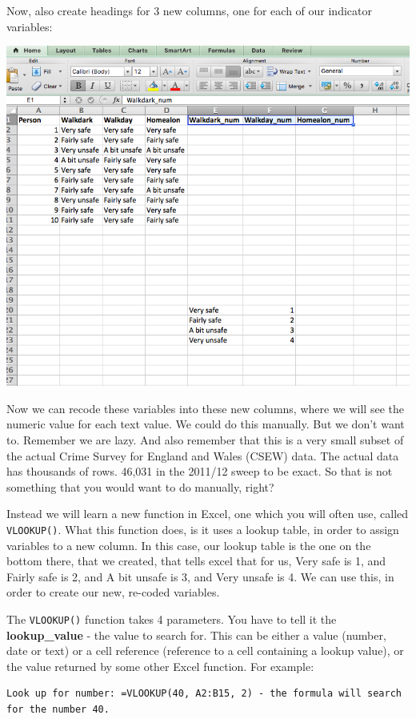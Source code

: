 \documentclass[
]{book}
\begin{document}
Now, also create headings for 3 new columns, one for each of our indicator variables:

\includegraphics{imgs/num_cols_lookup.png}

Now we can recode these variables into these new columns, where we will see the numeric value for each text value. We could do this manually. But we don't want to. Remember we are lazy. And also remember that this is a very small subset of the actual Crime Survey for England and Wales (CSEW) data. The actual data has thousands of rows. 46,031 in the 2011/12 sweep to be exact. So that is not something that you would want to do manually, right?

Instead we will learn a new function in Excel, one which you will often use, called \texttt{VLOOKUP()}. What this function does, is it uses a lookup table, in order to assign variables to a new column. In this case, our lookup table is the one on the bottom there, that we created, that tells excel that for us, Very safe is 1, and Fairly safe is 2, and A bit unsafe is 3, and Very unsafe is 4. We can use this, in order to create our new, re-coded variables.

The \texttt{VLOOKUP()} function takes 4 parameters. You have to tell it the \textbf{lookup\_value} - the value to search for. This can be either a value (number, date or text) or a cell reference (reference to a cell containing a lookup value), or the value returned by some other Excel function. For example:

\begin{verbatim}
Look up for number: =VLOOKUP(40, A2:B15, 2) - the formula will search for the number 40.
\end{verbatim}
\end{document}
